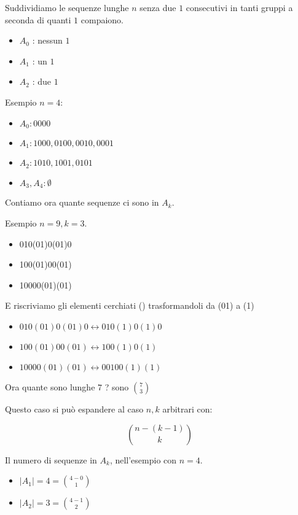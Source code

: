 \documentclass[11pt]{article}
\begin{document}
			Suddividiamo le sequenze lunghe $n$ senza due $1$ consecutivi
			in tanti gruppi a seconda di quanti $1$ compaiono.

			\begin{itemize}
				\item $A_0$ : nessun $1$
				\item $A_1$ : un $1$
				\item $A_2$ : due $1$
			\end{itemize}

			Esempio $n = 4$:

			\begin{itemize}
				\item $A_0 : 0000$ 
				\item $A_1 : 1000, 0100, 0010, 0001$
				\item $A_2 : 1010, 1001, 0101$
				\item $A_3, A_4	: \emptyset$
			\end{itemize}
			
			Contiamo ora quante sequenze ci sono in $A_k$.

			Esempio $n=9, k=3$.

			\begin{itemize}
				\item 010(01)0(01)0
				\item 100(01)00(01)
				\item 10000(01)(01)
			\end{itemize}

			E riscriviamo gli elementi cerchiati () trasformandoli
			da (01) a (1)

			\begin{itemize}
				\item $010(01)0(01)0 \longleftrightarrow 010(1)0(1)0$
				\item $100(01)00(01) \longleftrightarrow 100(1)0(1)$
				\item $10000(01)(01) \longleftrightarrow 00100(1)(1)$
			\end{itemize}

			Ora quante sono lunghe $7$ ? sono $\binom{7}{3}$

			Questo caso si pu\`o espandere al caso $n,k$ arbitrari con:

			\[
				\binom{n-(k-1)}{k}
			\]

			Il numero di sequenze in $A_k$, nell'esempio con  $n=4$.

			\begin{itemize}
				\item $|A_1| = 4 = \binom{4-0}{1}$
				\item $|A_2| = 3 = \binom{4-1}{2}$
			\end{itemize}
\end{document}
